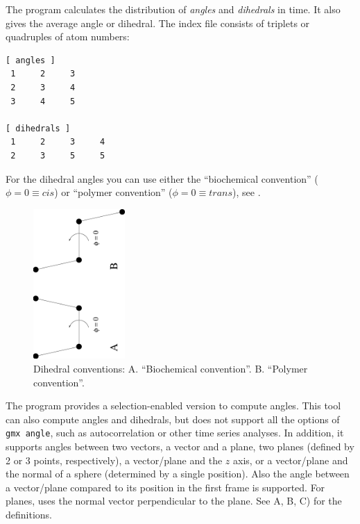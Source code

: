 The program {\tt {}} calculates the distribution of {\em angles} and
{\em dihedrals} in time. It also gives the average angle or dihedral. 
The index file consists of triplets or quadruples of atom numbers:

\begin{verbatim}
[ angles ]
 1     2     3
 2     3     4
 3     4     5

[ dihedrals ]
 1     2     3     4
 2     3     5     5
\end{verbatim}

For the dihedral angles you can use either the ``biochemical convention'' 
($\phi = 0 \equiv cis$) or ``polymer convention'' ($\phi = 0 \equiv trans$), 
see .

\begin{figure}
\centerline{
{\includegraphics[width=3.5cm,angle=270]{plots/dih-def}}}
\caption[Dihedral conventions.]{Dihedral conventions: A. ``Biochemical
convention''. B. ``Polymer convention''.}
\label{fig:dih_def}
\end{figure}

The program {\tt {}} provides a selection-enabled
version to compute angles.  This tool can also compute angles and
dihedrals, but does not support all the options of {\tt gmx angle}, such
as autocorrelation or other time series analyses.
In addition, it supports angles between two vectors, a vector and a
plane, two planes (defined by 2 or 3 points, respectively), a
vector/plane and the $z$ axis, or a vector/plane and the normal of a
sphere (determined by a single position).
Also the angle between a vector/plane compared to its position in the
first frame is supported.
For planes, {\tt {}} uses the normal vector
perpendicular to the plane.
See A, B, C) for the definitions.

